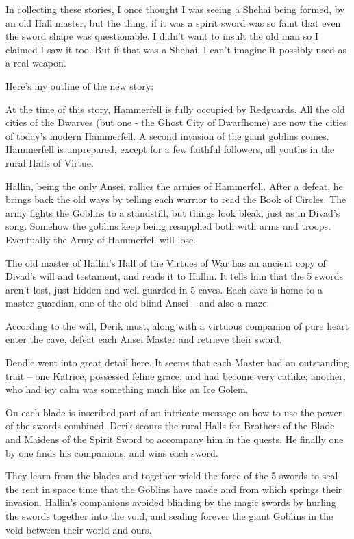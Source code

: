 In collecting these stories, I once thought I was seeing a Shehai being formed, by an old Hall master, but the thing, if it was a spirit sword was so faint that even the sword shape was questionable. I didn't want to insult the old man so I claimed I saw it too. But if that was a Shehai, I can't imagine it possibly used as a real weapon.

Here's my outline of the new story:

At the time of this story, Hammerfell is fully occupied by Redguards. All the old cities of the Dwarves (but one - the Ghost City of Dwarfhome) are now the cities of today's modern Hammerfell. A second invasion of the giant goblins comes. Hammerfell is unprepared, except for a few faithful followers, all youths in the rural Halls of Virtue.

Hallin, being the only Ansei, rallies the armies of Hammerfell. After a defeat, he brings back the old ways by telling each warrior to read the Book of Circles. The army fights the Goblins to a standstill, but things look bleak, just as in Divad's song. Somehow the goblins keep being resupplied both with arms and troops. Eventually the Army of Hammerfell will lose.

The old master of Hallin's Hall of the Virtues of War has an ancient copy of Divad's will and testament, and reads it to Hallin. It tells him that the 5 swords aren't lost, just hidden and well guarded in 5 caves. Each cave is home to a master guardian, one of the old blind Ansei -- and also a maze.

According to the will, Derik must, along with a virtuous companion of pure heart enter the cave, defeat each Ansei Master and retrieve their sword.

Dendle went into great detail here. It seems that each Master had an outstanding trait -- one Katrice, possessed feline grace, and had become very catlike; another, who had icy calm was something much like an Ice Golem.

On each blade is inscribed part of an intricate message on how to use the power of the swords combined. Derik scours the rural Halls for Brothers of the Blade and Maidens of the Spirit Sword to accompany him in the quests. He finally one by one finds his companions, and wins each sword.

They learn from the blades and together wield the force of the 5 swords to seal the rent in space time that the Goblins have made and from which springs their invasion. Hallin's companions avoided blinding by the magic swords by hurling the swords together into the void, and sealing forever the giant Goblins in the void between their world and ours.

